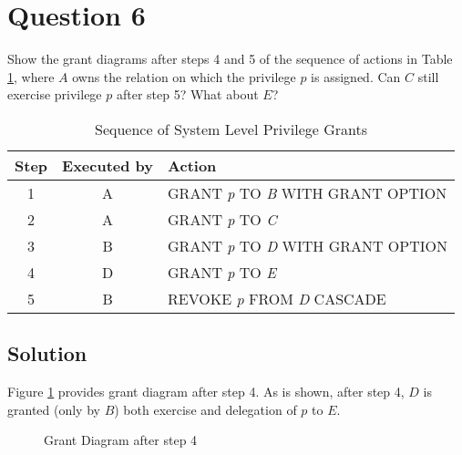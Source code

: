 
\section*{Question 6}

Show the grant diagrams after steps 4 and 5 of the sequence of actions in Table \ref{table51}, where $A$ owns the relation on which the privilege $p$ is assigned.
Can $C$ still exercise privilege $p$ after step 5? What about $E$?

\begin{table}[H]
\centering
\begin{tabular}{|c|c|l|}
\hline
Step & Executed by & Action\\
\hline \hline
1 & A & GRANT \textit{p} TO \textit{B} WITH GRANT OPTION\\
2 & A & GRANT \textit{p} TO \textit{C} \\
3 & B & GRANT \textit{p} TO \textit{D} WITH GRANT OPTION\\
4 & D & GRANT \textit{p} TO \textit{E} \\
5 & B & REVOKE \textit{p} FROM \textit{D} CASCADE\\
\hline
\end{tabular}
\caption{Sequence of System Level Privilege Grants}\label{table51}
\end{table}

\subsection*{Solution}

Figure \ref{fig1} provides grant diagram after step 4.
As is shown, after step 4, $D$ is granted (only by $B$) both exercise and delegation of $\textit{p}$ to $E$.

\begin{figure}[H]\centering
{}
\caption{Grant Diagram after step 4}\label{fig1}
\end{figure}

